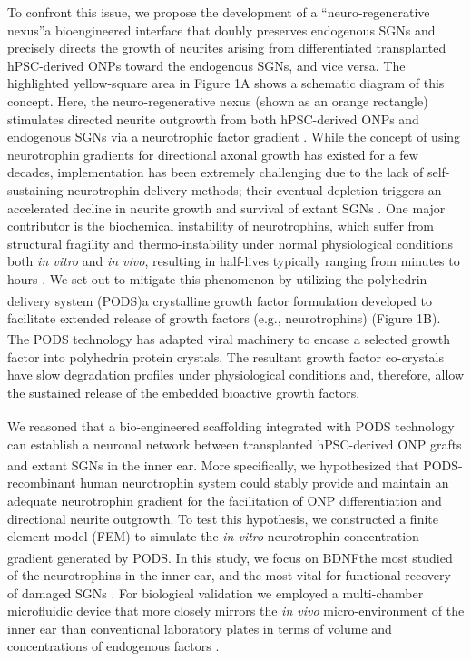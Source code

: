 \documentclass[review]{elsarticle}
\begin{document}
\indent To confront this issue, we propose the development of a “neuro-regenerative nexus”\textemdash a bioengineered interface that doubly preserves endogenous SGNs and precisely directs the growth of neurites arising from differentiated transplanted hPSC-derived ONPs toward the endogenous SGNs, and vice versa. The highlighted yellow-square area in Figure 1A shows a schematic diagram of this concept. Here, the neuro-regenerative nexus (shown as an orange rectangle) stimulates directed neurite outgrowth from both hPSC-derived ONPs and endogenous SGNs via a neurotrophic factor gradient \cite{Goodhill1998}. While the concept of using neurotrophin gradients for directional axonal growth has existed for a few decades, implementation has been extremely challenging due to the lack of self-sustaining neurotrophin delivery methods; their eventual depletion triggers an accelerated decline in neurite growth and survival of extant SGNs \cite{Gillespie2003, Pettingill2008, Shepherd2009}. One major contributor is the biochemical instability of neurotrophins, which suffer from structural fragility and thermo-instability under normal physiological conditions both \textit{in vitro} and \textit{in vivo}, resulting in half-lives typically ranging from minutes to hours \cite{Baseri2012}. We set out to mitigate this phenomenon by utilizing the polyhedrin delivery system (PODS\textsuperscript{\textregistered})\textemdash a crystalline growth factor formulation developed to facilitate extended release of growth factors (e.g., neurotrophins) \cite{Ikeda2001a,Suzuki1997,Mori1993} (Figure 1B). The PODS\textsuperscript{\textregistered} technology has adapted viral machinery to encase a selected growth factor into polyhedrin protein crystals. The resultant growth factor co-crystals have slow degradation profiles under physiological conditions and, therefore, allow the sustained release of the embedded bioactive growth factors.  

\indent We reasoned that a bio-engineered scaffolding integrated with PODS\textsuperscript{\textregistered} technology can establish a neuronal network between transplanted hPSC-derived ONP grafts and extant SGNs in the inner ear. More specifically, we hypothesized that PODS\textsuperscript{\textregistered}-recombinant human neurotrophin system could stably provide and maintain an adequate neurotrophin gradient for the facilitation of ONP differentiation and directional neurite outgrowth. To test this hypothesis, we constructed a finite element model (FEM) to simulate the \textit{in vitro} neurotrophin concentration gradient generated by PODS\textsuperscript{\textregistered}. In this study, we focus on BDNF\textemdash the most studied of the neurotrophins in the inner ear, and the most vital for functional recovery of damaged SGNs \cite{green2012}. For biological validation we employed a multi-chamber microfluidic device that more closely mirrors the \textit{in vivo} micro-environment of the inner ear than conventional laboratory plates in terms of volume and concentrations of endogenous factors \cite{Meyvantsson2008}. 
\end{document}
